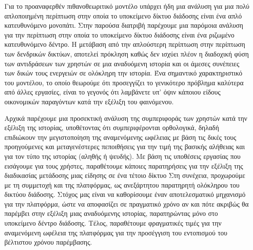 Για το προαναφερθέν πιθανοθεωριτικό μοντέλο υπάρχει ήδη μια ανάλυση για μια πολύ απλοποιημένη περίπτωση στην οποία το υποκείμενο δίκτυο διάδοσης είναι ένα απλό κατευθυνόμενο μονοπάτι. Στην παρούσα διατριβή παρέχουμε μια παρόμοια ανάλυση για την περίπτωση στην οποία το υποκείμενο δίκτυο διάδοσης είναι ένα ριζωμένο κατευθυνόμενο δέντρο. Η μετάβαση από την απλούστερη περίπτωση στην περίπτωση των δενδρικών δικτύων, αποτελεί πρόκληση καθώς δεν ισχύει πλέον η διαδοχική φύση των αντιδράσεων των χρηστών σε μια αναδυόμενη ιστορία και οι άμεσες συνέπειες των δικών τους ενεργειών σε ολόκληρη την ιστορία. Ένα σημαντικό χαρακτηριστικό του μοντέλου, το οποίο θεωρούμε ότι προσεγγίζει το γενικότερο πρόβλημα καλύτερα από άλλες εργασίες, είναι το γεγονός ότι λαμβάνετε υπ' όψιν κάποιου είδους οικονομικών παραγόντων κατά την εξέλιξη του φαινόμενου.


Αρχικά παρέχουμε μια προσεκτική ανάλυση της συμπεριφοράς των χρηστών κατά την εξέλιξη της ιστορίας, υποθέτοντας ότι συμπεριφέρονται ορθολογικά, δηλαδή επιδιώκουν την μεγιστοποίηση της αναμενόμενης ωφέλειας με βάση τις δικές τους προηγούμενες και μεταγενέστερες πεποιθήσεις για την τιμή της βασικής αλήθειας και για τον τύπο της ιστορίας (αληθής ή ψευδής). Με βάση τις υποθέσεις εργασίας που εισάγουμε για τους χρήστες, παραθέτουμε κάποιες παρατηρήσεις για την εξέλιξη της διαδικασίας μετάδοσης μιας είδησης σε ένα τέτοιο δίκτυο Στη συνέχεια, προχωρούμε με τη συμμετοχή και της πλατφόρμας, ως ανεξάρτητου παρατηρητή ολόκληρου του δικτύου διάδοσης. Στόχος μας είναι να καθορίσουμε έναν αποτελεσματικό μηχανισμό για την πλατφόρμα, ώστε να αποφασίζει σε πραγματικό χρόνο αν και πότε ακριβώς θα παρέμβει στην εξέλιξη μιας αναδυόμενης ιστορίας, παρατηρώντας μόνο στο υποκείμενο δέντρο διάδοσης. Τέλος, παραθέτουμε φραγματικές τιμές για την αναμενόμενη ωφέλεια της πλατφόρμας για την προσέγγιση του εντοπισμού του βέλτιστου χρόνου παρέμβασης.



\noindent 

\bigskip

